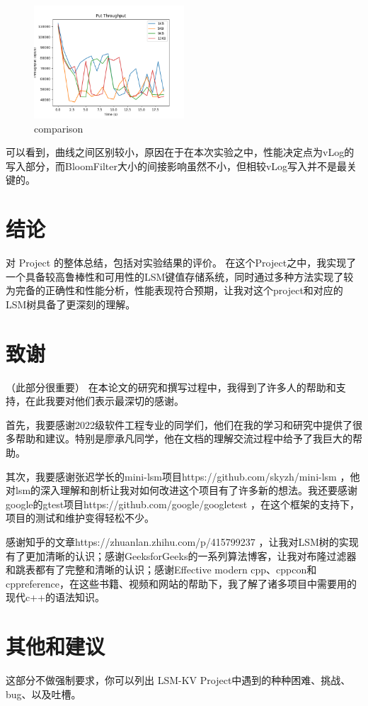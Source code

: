 \documentclass[fontset=none]{article}
\begin{document}
\begin{figure}[h!]
    \centering
    \includegraphics[width=0.5\textwidth]{../imgs/put_plot_test/comparison.png}
    \caption{comparison}\label{fig:comparison}
\end{figure}
可以看到，曲线之间区别较小，原因在于在本次实验之中，性能决定点为vLog的写入部分，而BloomFilter大小的间接影响虽然不小，但相较vLog写入并不是最关键的。



\section{结论}
对 Project 的整体总结，包括对实验结果的评价。
在这个Project之中，我实现了一个具备较高鲁棒性和可用性的LSM键值存储系统，同时通过多种方法实现了较为完备的正确性和性能分析，性能表现符合预期，让我对这个project和对应的LSM树具备了更深刻的理解。

\section{致谢}
（此部分很重要）
在本论文的研究和撰写过程中，我得到了许多人的帮助和支持，在此我要对他们表示最深切的感谢。

首先，我要感谢2022级软件工程专业的同学们，他们在我的学习和研究中提供了很多帮助和建议。特别是廖承凡同学，他在文档的理解交流过程中给予了我巨大的帮助。

其次，我要感谢张迟学长的mini-lsm项目https://github.com/skyzh/mini-lsm ，他对lsm的深入理解和剖析让我对如何改进这个项目有了许多新的想法。我还要感谢google的gtest项目https://github.com/google/googletest ，在这个框架的支持下，项目的测试和维护变得轻松不少。

感谢知乎的文章https://zhuanlan.zhihu.com/p/415799237 ，让我对LSM树的实现有了更加清晰的认识；感谢GeeksforGeeks的一系列算法博客，让我对布隆过滤器和跳表都有了完整和清晰的认识；感谢Effective modern cpp、cppcon和cppreference，在这些书籍、视频和网站的帮助下，我了解了诸多项目中需要用的现代c++的语法知识。

\section{其他和建议}
这部分不做强制要求，你可以列出 LSM-KV Project中遇到的种种困难、挑战、bug、以及吐槽。
\end{document}
